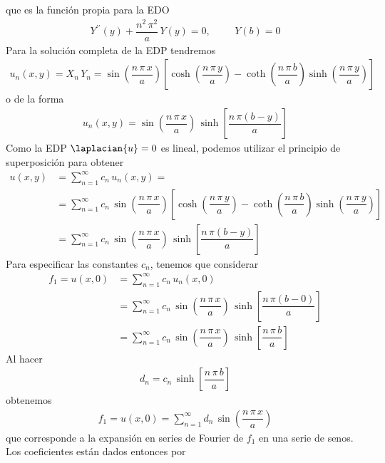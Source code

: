 que es la función propia para la EDO
\begin{align*}
Y^{\prime \prime} (y) + \dfrac{n^{2} \, \pi^{2}}{a} \, Y(y) = 0, \hspace{1cm} Y(b) = 0
\end{align*}
Para la solución completa de la EDP tendremos
\begin{align*}
u_{n} (x, y) = X_{n} \, Y_{n} = \sin \left( \dfrac{n \, \pi \, x}{a} \right) \left[  \cosh \left( \dfrac{n \, \pi \, y}{a} \right) - \coth \left( \dfrac{n \, \pi \, b}{a} \right) \sinh \left( \dfrac{n \, \pi \, y}{a} \right) \right]
\end{align*}
o de la forma
\begin{align*}
u_{n} (x, y) = \sin \left( \dfrac{n \, \pi \, x}{a} \right) \, \sinh \left[ \dfrac{n \, \pi (b - y)}{a} \right]
\end{align*}
Como la EDP $\laplacian{u} = 0$ es lineal, podemos utilizar el principio de superposición para obtener
\begin{align*}
u (x, y) &= \sum_{n=1}^{\infty} c_{n} \, u_{n} (x, y) = \\
&= \sum_{n=1}^{\infty} c_{n} \, \sin \left( \dfrac{n \, \pi \, x}{a} \right) \left[  \cosh \left( \dfrac{n \, \pi \, y}{a} \right) - \coth \left( \dfrac{n \, \pi \, b}{a} \right) \sinh \left( \dfrac{n \, \pi \, y}{a} \right) \right] \\
&= \sum_{n=1}^{\infty} c_{n} \, \sin \left( \dfrac{n \, \pi \, x}{a} \right) \, \sinh \left[ \dfrac{n \, \pi (b - y)}{a} \right]
\end{align*}
Para especificar las constantes $c_{n}$, tenemos que considerar
\begin{align*}
f_{1} = u(x, 0) &= \sum_{n=1}^{\infty} c_{n} \, u_{n} (x, 0) \\[1em]
&= \sum_{n=1}^{\infty} c_{n} \, \sin \left( \dfrac{n \, \pi \, x}{a} \right) \, \sinh \left[ \dfrac{n \, \pi (b - 0)}{a} \right] \\[1em]
&= \sum_{n=1}^{\infty} c_{n} \, \sin \left( \dfrac{n \, \pi \, x}{a} \right) \, \sinh \left[ \dfrac{n \, \pi \, b}{a} \right]
\end{align*}
Al hacer
\begin{align*}
d_{n} = c_{n} \, \sinh \left[ \dfrac{n \, \pi \, b}{a} \right]
\end{align*}
obtenemos
\begin{align*}
f_{1} = u (x, 0) = \sum_{n=1}^{\infty} d_{n} \, \sin \left( \dfrac{n \, \pi \, x}{a} \right)
\end{align*}
que corresponde a la expansión en series de Fourier de $f_{1}$ en una serie de senos. Los coeficientes están dados entonces por
